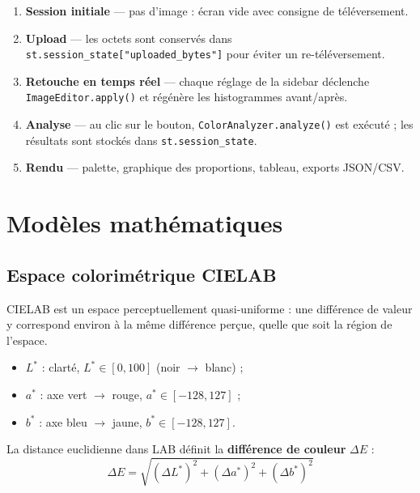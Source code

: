 \documentclass[11pt,a4paper]{article}
\begin{document}
\begin{enumerate}
  \item \textbf{Session initiale} --- pas d'image : écran vide avec
        consigne de téléversement.
  \item \textbf{Upload} --- les octets sont conservés dans
        \texttt{st.session\_state["uploaded\_bytes"]} pour éviter un
        re-téléversement.
  \item \textbf{Retouche en temps réel} --- chaque réglage de la sidebar
        déclenche \texttt{ImageEditor.apply()} et régénère les
        histogrammes avant/après.
  \item \textbf{Analyse} --- au clic sur le bouton,
        \texttt{ColorAnalyzer.analyze()} est exécuté ; les résultats sont
        stockés dans \texttt{st.session\_state}.
  \item \textbf{Rendu} --- palette, graphique des proportions, tableau,
        exports JSON/CSV.
\end{enumerate}

\section{Modèles mathématiques}

\subsection{Espace colorimétrique CIELAB}

CIELAB est un espace perceptuellement quasi-uniforme : une différence de
valeur y correspond environ à la même différence perçue, quelle que soit la
région de l'espace.

\begin{itemize}
  \item $L^*$ : clarté, $L^* \in [0, 100]$ (noir $\rightarrow$ blanc) ;
  \item $a^*$ : axe vert $\rightarrow$ rouge, $a^* \in [-128, 127]$ ;
  \item $b^*$ : axe bleu $\rightarrow$ jaune, $b^* \in [-128, 127]$.
\end{itemize}

La distance euclidienne dans LAB définit la \textbf{différence de couleur}
$\Delta E$ :
\begin{equation}
  \Delta E = \sqrt{(\Delta L^*)^2 + (\Delta a^*)^2 + (\Delta b^*)^2}
  \label{eq:dE}
\end{equation}
\end{document}
